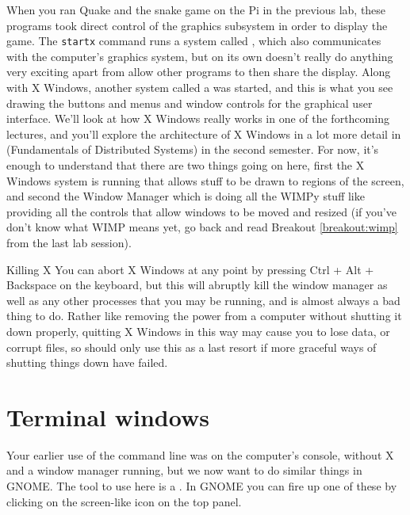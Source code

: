 When you ran Quake and the snake game on the Pi in the previous lab, these programs took direct control of the graphics subsystem in order to display the game. The \texttt{startx} command runs a system called , which also communicates with the computer's graphics system, but on its own doesn't really do anything very exciting apart from allow other programs to then share the display. Along with X Windows, another system called a  was started, and this is what you see drawing the buttons and menus and window controls for the graphical user interface. We'll look at how X Windows really works in one of the forthcoming  lectures, and you'll explore the architecture of X Windows in a lot more detail in  (Fundamentals of Distributed Systems) in the second semester. For now, it's enough to understand that there are two things going on here, first the X Windows system is running that allows stuff to be drawn to regions of the screen, and second the Window Manager which is doing all the WIMPy stuff like providing all the controls that allow windows to be moved and resized (if you've don't know what WIMP means yet, go back and read Breakout \ref{breakout:wimp} from the last lab session). 

\begin{danger}{Killing X}
You can abort X Windows at any point by pressing Ctrl + Alt + Backspace on the keyboard, but this will abruptly kill the window manager as well as any other processes that you may be running, and is almost always a bad thing to do. Rather like removing the power from a computer without shutting it down properly, quitting X Windows in this way may cause you to lose data, or corrupt files, so should only use this as a last resort if more graceful ways of shutting things down have failed.
\end{danger}

\section{Terminal windows}
Your earlier use of the command line was on the computer's console, without X and a window manager running, but we now want to do similar things in GNOME. The tool to use here is a . In GNOME you can fire up one of  these by clicking on the screen-like icon on the top panel.


